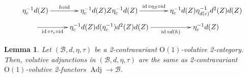 \documentclass[10pt,a4paper]{amsart}
\newtheorem{lemma}{Lemma}
\newcommand{\Adj}{\operatorname{Adj}}%
\newcommand{\B}{\mathcal{B}}
\newcommand{\Oone}{\operatorname{O(1)}}
\newcommand{\id}{\operatorname{id}}%
\begin{document}
    \begin{equation}\label{Equation: second condition of h in volutive adjunction}
        \begin{aligned}
        \xymatrix@R=0.5em{
            \eta_c^{-1} d(Z) \ar[r]^-{h \circ \id} & \eta_c^{-1} d(Z) Z \eta_c^{-1} d(Z) \ar[r]^-{\id \circ \eta_Z \circ \id} & 
            \eta_c^{-1} d(Z) \eta_{d(c)}^{-1} d^2(Z) d(Z) \\
            \ar[r]_-{\id \circ \tau_c \circ \id} & 
            \eta_c^{-1} d(Z) d(\eta_c^{-1}) d^2(Z) d(Z) \ar[r]_-{\id \circ d(h)} &\eta_c^{-1} d(Z)
        }
        \end{aligned}
    \end{equation}

\begin{lemma}\label{Lemma: volutive adjunctions and volutive functors from the walking adjunction}
    Let $(\B,d,\eta,\tau)$ be a 2-contravariant $\Oone$-volutive 2-category. Then, volutive adjunctions in $(\B,d,\eta,\tau)$ are the same as 
    2-contravariant $\Oone$-volutive 2-functors $\Adj \to \B$. 
\end{lemma}
\end{document}
